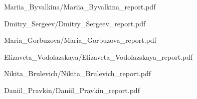 \documentclass[a4paper]{article}
\begin{document}
{Mariia_Byvalkina/Mariia_Byvalkina_report.pdf}

{Dmitry_Sergeev/Dmitry_Sergeev_report.pdf}

{Maria_Gorbuzova/Maria_Gorbuzova_report.pdf}

{Elizaveta_Vodolazskaya/Elizaveta_Vodolazskaya_report.pdf}

{Nikita_Brulevich/Nikita_Brulevich_report.pdf}

{Daniil_Pravkin/Daniil_Pravkin_report.pdf}
\end{document}
